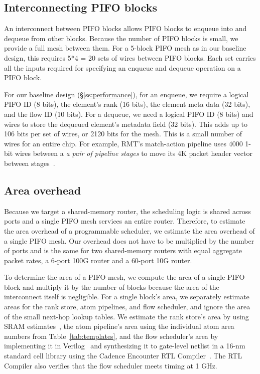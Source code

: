 \subsection{Interconnecting PIFO blocks}
\label{ss:interconnect}

An interconnect between PIFO blocks allows PIFO blocks to enqueue into and
dequeue from other blocks. Because the number of PIFO blocks is small, we
provide a full mesh between them. For a 5-block PIFO mesh as in our baseline
design, this requires 5*4 = 20 sets of wires between PIFO blocks. Each set
carries all the inputs required for specifying an enqueue and dequeue operation
on a PIFO block.

For our baseline design (\S\ref{ss:performance}), for an enqueue, we require a
logical PIFO ID (8 bits), the element's rank (16 bits), the element meta data
(32 bits), and the flow ID (10 bits). For a dequeue, we need a logical PIFO ID
(8 bits) and wires to store the dequeued element's metadata field (32 bits).
This adds up to 106 bits per set of wires, or 2120 bits for the mesh. This is a
small number of wires for an entire chip.  For example, RMT's match-action pipeline
uses 4000 1-bit wires between a {\em a pair of pipeline stages} to move its 4K
packet header vector between stages~\cite{rmt}. 

\subsection{Area overhead}
\label{ss:feasibility}

Because we target a shared-memory router, the scheduling logic is shared
across ports and a single PIFO mesh services an entire router. Therefore, to
estimate the area overhead of a programmable scheduler, we estimate the area
overhead of a single PIFO mesh. Our overhead does not have to be multiplied by
the number of ports and is the same for two shared-memory routers with equal
aggregate packet rates, \eg a 6-port 100G router and a 60-port 10G router.

To determine the area of a PIFO mesh, we compute the area of a single PIFO
block and multiply it by the number of blocks because the area of the
interconnect itself is negligible.  For a single block's area, we separately
estimate areas for the rank store, atom pipelines, and flow scheduler, and
ignore the area of the small next-hop lookup tables.  We estimate the rank
store's area by using SRAM estimates~\cite{sram_estimate}, the atom pipeline's
area using the individual atom area numbers from Table~\ref{tab:templates}, and
the flow scheduler's area by implementing it in Verilog~\cite{system_verilog}
and synthesizing it to gate-level netlist in a 16-nm standard cell library
using the Cadence Encounter RTL Compiler~\cite{cadence_rc}. The RTL Compiler
also verifies that the flow scheduler meets timing at 1 GHz.


